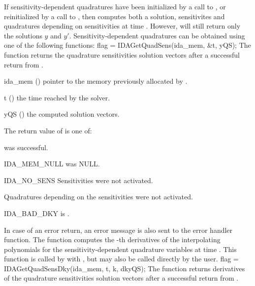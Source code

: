If sensitivity-dependent quadratures have been initialized by a call to ,
or reinitialized by a call to , then {\idas} computes both a solution,
sensitivites and quadratures depending on sensitivities at time . However, 
 will still return only the solutions $y$ and $y'$. Sensitivity-dependent 
quadratures can be obtained using one of the following functions:
{
  flag = IDAGetQuadSens(ida\_mem, \&t, yQS);
}
{
  The function  returns the quadrature sensitivities
  solution vectors after a successful return from .
}
{
  \begin{args}
  \item[ida\_mem] ()
    pointer to the memory previously allocated by .
  \item[t] ()
    the time reached by the solver.
  \item[yQS] ()
    the computed solution vectors.
  \end{args}
}
{
  The return value  of  is one of:
  \begin{args}
  \item[\Id{IDA\_SUCCESS}] 
     was successful.
  \item[IDA\_MEM\_NULL] 
     was NULL.
  \item[IDA\_NO\_SENS]
    Sensitivities were not activated.
  \item[\Id{IDA\_NO\_QUADSENS}] 
    Quadratures depending on the sensitivities were not activated.
  \item[IDA\_BAD\_DKY] 
     is .
  \end{args}
}
{
  In case of an error return, an error message is also sent to the error handler
  function.
}
The function  computes the -th derivatives of the interpolating 
polynomials for the sensitivity-dependent quadrature variables at time .
This function is called by  with , but may also be called 
directly by the user.
{
  flag = IDAGetQuadSensDky(ida\_mem, t, k, dkyQS);
}
{
  The function  returns derivatives of the quadrature sensitivities 
  solution vectors after a successful return from .
}
